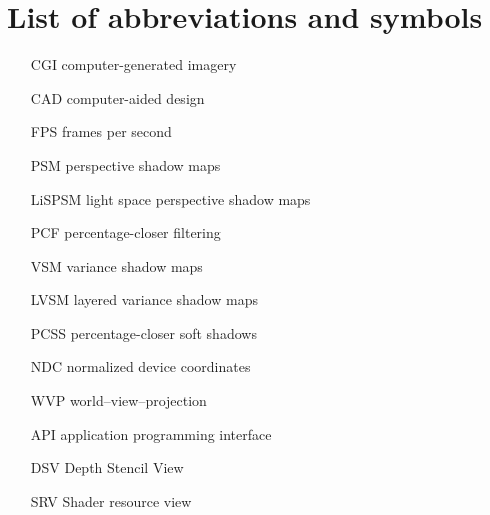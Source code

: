 \chapter{List of abbreviations and symbols}

\begin{itemize}
\item[CGI] computer-generated imagery
\item[CAD] computer-aided design
\item[FPS] frames per second
\item[PSM] perspective shadow maps
\item[LiSPSM] light space perspective shadow maps
\item[PCF] percentage-closer filtering
\item[VSM] variance shadow maps
\item[LVSM] layered variance shadow maps
\item[PCSS] percentage-closer soft shadows

\item[NDC] normalized device coordinates
\item[WVP] world--view--projection
\item[API] application programming interface
\item[DSV] Depth Stencil View
\item[SRV] Shader resource view

\end{itemize}